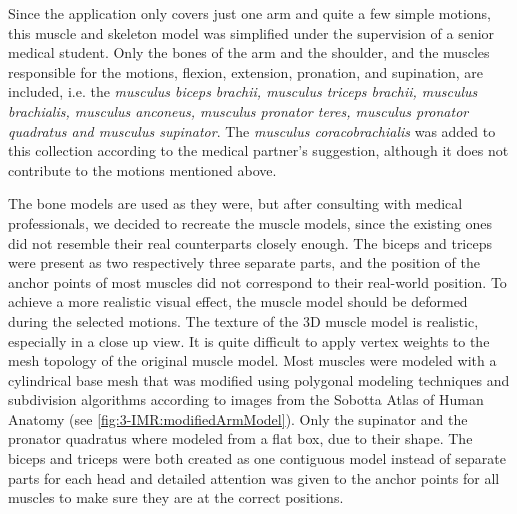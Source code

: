 Since the application only covers just one arm and quite a few simple motions, this muscle and skeleton model was simplified under the supervision of a senior medical student. Only the bones of the arm and the shoulder, and the muscles responsible for the motions, flexion, extension, pronation, and supination, are included, i.e. the \textit{musculus biceps brachii, musculus triceps brachii, musculus brachialis, musculus anconeus, musculus pronator teres, musculus pronator quadratus and musculus supinator}. The \textit{musculus coracobrachialis} was added to this collection according to the medical partner's suggestion, although it does not contribute to the motions mentioned above.

The bone models are used as they were, but after consulting with medical professionals, we decided to recreate the muscle models, since the existing ones did not resemble their real counterparts closely enough. The biceps and triceps were present as two respectively three separate parts, and the position of the anchor points of most muscles did not correspond to their real-world position. To achieve a more realistic visual effect, the muscle model should be deformed during the selected motions.
The texture of the 3D muscle model is realistic, especially in a close up view. It is quite difficult to apply vertex weights to the mesh topology of the original muscle model. 
Most muscles were modeled with a cylindrical base mesh that was modified using polygonal modeling techniques and subdivision algorithms according to images from the Sobotta Atlas of Human Anatomy (see \figurename{\ref{fig:3-IMR:modifiedArmModel}}). Only the supinator and the pronator quadratus where modeled from a flat box, due to their shape. The biceps and triceps were both created as one contiguous model instead of separate parts for each head and detailed attention was given to the anchor points for all muscles to make sure they are at the correct positions.
